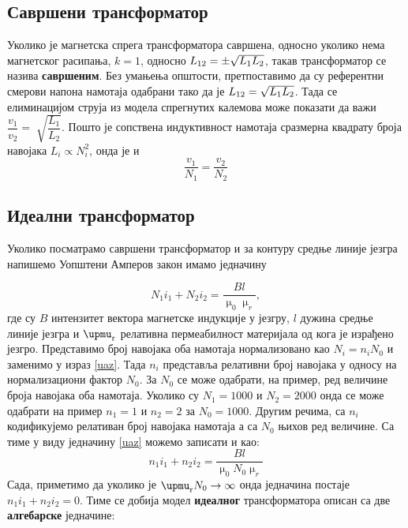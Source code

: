 \subsection*{Савршени трансформатор}
Уколико је магнетска спрега трансформатора савршена, односно 
уколико нема магнетског расипања, $k = 1$, односно $L_{\rm 12} = \pm \sqrt{L_1 L_2}$,
такав трансформатор се назива \textbf{савршеним}. 
Без умањења  
општости, претпоставимо да су референтни смерови напона намотаја
одабрани тако да је $L_{\rm 12} = \sqrt{L_1 L_2}$. Тада се 
елиминацијом струја из модела спрегнутих калемова може показати да 
важи $\dfrac{v_1}{v_2 } = \sqrt[]{\dfrac{L_1}{L_2}}$. Пошто је 
сопствена индуктивност намотаја сразмерна квадрату броја навојака 
$L_i \propto N_i^2$, онда је и 
\begin{equation}
\boxed{
\dfrac{v_1}{N_1} = \dfrac{v_2}{N_2}
}
\end{equation}


\subsection*{Идеални трансформатор}
Уколико посматрамо савршени трансформатор и за контуру средње 
линије језгра напишемо Уопштени Амперов закон имамо једначину 

\begin{equation}
N_1 i_1 + N_2 i_2 = \dfrac{B l}{\upmu_0 \upmu_r},
\label{uaz}
\end{equation}
где су 
$B$ интензитет вектора магнетске индукције у језгру, $l$ 
дужина средње линије језгра и $\upmu_{\rm r}$  релативна пермеабилност
материјала од кога је израђено језгро. Представимо број навојака оба намотаја нормализовано као $N_{i} = n_i N_0$ и заменимо у 
израз \eqref{uaz}. Тада $n_{i}$ представља релативни број 
навојака у односу на нормализациони фактор
$N_0$. За $N_0$ се може
одабрати, на пример, ред величине броја навојака оба намотаја. Уколико
су $N_1 = 1000$ и $N_2 = 2000$ онда се може одабрати на пример 
$n_1 = 1$ и $n_2 = 2$ за $N_0 = 1000$. Другим речима, са $n_i$ кодификујемо релативан број навојака намотаја а са $N_0$ њихов ред величине. Са тиме у виду 
једначину \eqref{uaz} можемо записати и као:
\begin{equation}
n_1 i_1 + n_2 i_2 = \dfrac{Bl}{\upmu_0 N_0 \upmu_r}
\end{equation}
Сада, приметимо да уколико је $\upmu_{\rm r}N_0 \to \infty$ онда 
једначина постаје $\boxed{n_1 i_1 + n_2 i_2 = 0}$. 
Тиме се добија модел \textbf{идеалног} 
трансформатора описан са две \textbf{алгебарске} једначине:

